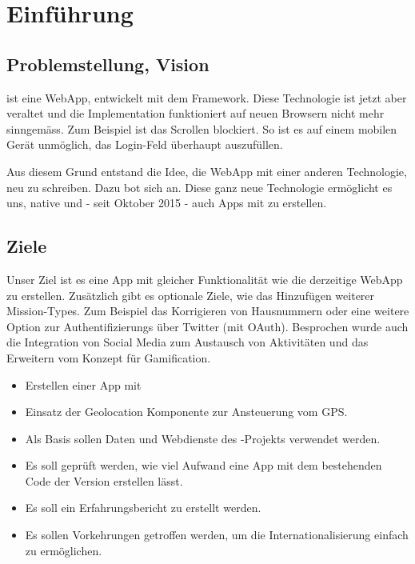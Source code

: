 \chapter{Einführung}
\label{tb-einfuehrung}

\section{Problemstellung, Vision}
\kort{} ist eine \gls{WebApp}, entwickelt mit dem  \gls{Framework}.
Diese Technologie ist jetzt aber veraltet und die Implementation funktioniert auf neuen Browsern nicht mehr sinngemäss.
Zum Beispiel ist das Scrollen blockiert.
So ist es auf einem mobilen Gerät unmöglich, das Login-Feld überhaupt auszufüllen.

Aus diesem Grund entstand die Idee, die \kort{} \gls{WebApp} mit einer anderen Technologie, neu zu schreiben.
Dazu bot sich  an. 
Diese ganz neue Technologie ermöglicht es uns, native  und - seit Oktober 2015 - auch  Apps mit  zu erstellen. 


\section{Ziele}
Unser Ziel ist es eine  App mit gleicher Funktionalität wie die derzeitige \gls{WebApp} zu erstellen.
Zusätzlich gibt es optionale Ziele, wie das Hinzufügen weiterer Mission-Types.
Zum Beispiel das Korrigieren von Hausnummern oder eine weitere Option zur  Authentifizierungs über Twitter (mit \gls{OAuth}).
Besprochen wurde auch die Integration von Social Media zum Austausch von Aktivitäten und das Erweitern vom Konzept für Gamification.

\begin{itemize}
	\item Erstellen einer  App mit 
	\item Einsatz der  Geolocation Komponente zur Ansteuerung vom GPS.
	\item Als Basis sollen Daten und Webdienste des -Projekts verwendet werden.
	\item Es soll geprüft werden, wie viel Aufwand eine  App mit dem bestehenden Code der  Version erstellen lässt.
	\item Es soll ein Erfahrungsbericht zu  erstellt werden.
	\item Es sollen Vorkehrungen getroffen werden, um die Internationalisierung einfach zu ermöglichen.
\end{itemize}


